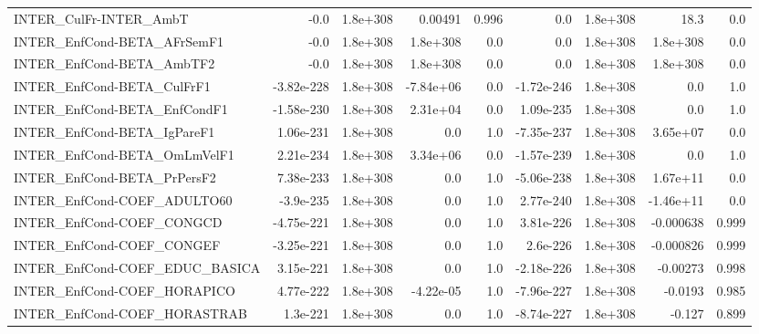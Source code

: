 \begin{tabular}{lrrrrrrrr}
INTER\_CulFr-INTER\_AmbT                &        -0.0 &     1.8e+308 &    0.00491 &    0.996 &        0.0 &    1.8e+308 &         18.3 &           0.0 \\
INTER\_EnfCond-BETA\_AFrSemF1           &        -0.0 &     1.8e+308 &   1.8e+308 &      0.0 &        0.0 &    1.8e+308 &     1.8e+308 &           0.0 \\
INTER\_EnfCond-BETA\_AmbTF2             &        -0.0 &     1.8e+308 &   1.8e+308 &      0.0 &        0.0 &    1.8e+308 &     1.8e+308 &           0.0 \\
INTER\_EnfCond-BETA\_CulFrF1            &  -3.82e-228 &     1.8e+308 &  -7.84e+06 &      0.0 & -1.72e-246 &    1.8e+308 &          0.0 &           1.0 \\
INTER\_EnfCond-BETA\_EnfCondF1          &  -1.58e-230 &     1.8e+308 &   2.31e+04 &      0.0 &  1.09e-235 &    1.8e+308 &          0.0 &           1.0 \\
INTER\_EnfCond-BETA\_IgPareF1           &   1.06e-231 &     1.8e+308 &        0.0 &      1.0 & -7.35e-237 &    1.8e+308 &     3.65e+07 &           0.0 \\
INTER\_EnfCond-BETA\_OmLmVelF1          &   2.21e-234 &     1.8e+308 &   3.34e+06 &      0.0 & -1.57e-239 &    1.8e+308 &          0.0 &           1.0 \\
INTER\_EnfCond-BETA\_PrPersF2           &   7.38e-233 &     1.8e+308 &        0.0 &      1.0 & -5.06e-238 &    1.8e+308 &     1.67e+11 &           0.0 \\
INTER\_EnfCond-COEF\_ADULTO60           &   -3.9e-235 &     1.8e+308 &        0.0 &      1.0 &  2.77e-240 &    1.8e+308 &    -1.46e+11 &           0.0 \\
INTER\_EnfCond-COEF\_CONGCD             &  -4.75e-221 &     1.8e+308 &        0.0 &      1.0 &  3.81e-226 &    1.8e+308 &    -0.000638 &         0.999 \\
INTER\_EnfCond-COEF\_CONGEF             &  -3.25e-221 &     1.8e+308 &        0.0 &      1.0 &   2.6e-226 &    1.8e+308 &    -0.000826 &         0.999 \\
INTER\_EnfCond-COEF\_EDUC\_BASICA        &   3.15e-221 &     1.8e+308 &        0.0 &      1.0 & -2.18e-226 &    1.8e+308 &     -0.00273 &         0.998 \\
INTER\_EnfCond-COEF\_HORAPICO           &   4.77e-222 &     1.8e+308 &  -4.22e-05 &      1.0 & -7.96e-227 &    1.8e+308 &      -0.0193 &         0.985 \\
INTER\_EnfCond-COEF\_HORASTRAB          &    1.3e-221 &     1.8e+308 &        0.0 &      1.0 & -8.74e-227 &    1.8e+308 &       -0.127 &         0.899 \\

\end{tabular}

